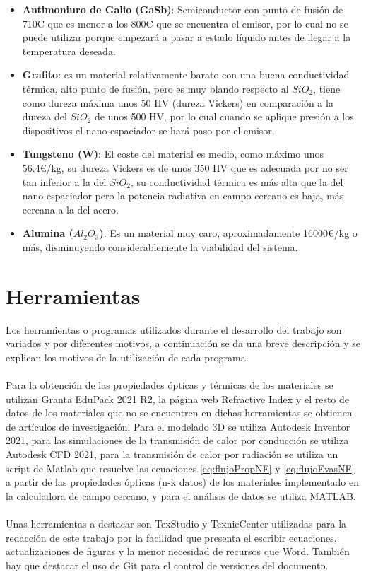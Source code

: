 \begin{itemize}
	\item \textbf{Antimoniuro de Galio (GaSb)}: Semiconductor con punto de fusión de 710\textdegree C que es menor a los 800\textdegree C que se encuentra el emisor, por lo cual no se puede utilizar porque empezará a pasar a estado líquido antes de llegar a la temperatura deseada.
	\item \textbf{Grafito}: es un material relativamente barato con una buena conductividad térmica, alto punto de fusión, pero es muy blando respecto al $SiO_2$, tiene como dureza máxima unos 50 HV (dureza Vickers) en comparación a la dureza del $SiO_2$ de unos 500 HV, por lo cual cuando se aplique presión a los dispositivos el nano-espaciador se hará paso por el emisor.
	\item \textbf{Tungsteno (W)}: El coste del material es medio, como máximo unos 56.4€/kg, su dureza Vickers es de unos 350 HV que es adecuada por no ser tan inferior a la del $SiO_2$, su conductividad térmica es más alta que la del nano-espaciador pero la potencia radiativa en campo cercano es baja, más cercana a la del acero.
	\item \textbf{Alumina ($Al_2O_3$)}: Es un material muy caro, aproximadamente 16000€/kg o más, disminuyendo considerablemente la viabilidad del sistema.
\end{itemize}

\section{Herramientas}

Los herramientas o programas utilizados durante el desarrollo del trabajo son variados y por diferentes motivos, a continuación se da una breve descripción y se explican los motivos de la utilización de cada programa.\\\\
Para la obtención de las propiedades ópticas y térmicas de los materiales se utilizan Granta EduPack 2021 R2, la página web Refractive Index y el resto de datos de los materiales que no se encuentren en dichas herramientas se obtienen de artículos de investigación. Para el modelado 3D se utiliza Autodesk Inventor 2021, para las simulaciones de la transmisión de calor por conducción se utiliza Autodesk CFD 2021, para la transmisión de calor por radiación se utiliza un script de Matlab que resuelve las ecuaciones \eqref{eq:flujoPropNF} y \eqref{eq:flujoEvasNF} a partir de las propiedades ópticas (n-k datos) de los materiales implementado en la calculadora de campo cercano, y para el análisis de datos se utiliza MATLAB.\\\\
Unas herramientas a destacar son TexStudio y TexnicCenter utilizadas para la redacción de este trabajo por la facilidad que presenta el escribir ecuaciones, actualizaciones de figuras y la menor necesidad de recursos que Word. También hay que destacar el uso de Git para el control de versiones del documento.\\
